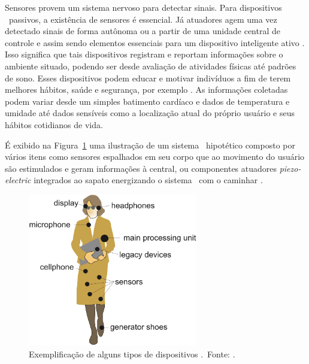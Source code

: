         Sensores provem um sistema nervoso para detectar sinais.
        Para dispositivos \wearables\ passivos, a existência de sensores é essencial.
        Já atuadores agem uma vez detectado sinais de forma autônoma ou a partir de uma unidade central de controle e assim sendo elementos essenciais para um dispositivo inteligente ativo \citep{starner1996human}.
        Isso significa que tais dispositivos registram e reportam informações sobre o ambiente situado, podendo ser desde avaliação de atividades físicas até padrões de sono.
        Esses dispositivos podem educar e motivar indivíduos a fim de terem melhores hábitos, saúde e segurança, por exemplo \citep{patel2015wearable}.
        As informações coletadas podem variar desde um simples batimento cardíaco e dados de temperatura e umidade até dados sensíveis como a localização atual do próprio usuário e seus hábitos cotidianos de vida.
        
        
        É exibido na Figura~\ref{fig:into-wearable} uma ilustração de um sistema \wearable\ hipotético composto por vários itens como 
        sensores espalhados em seu corpo que ao movimento do usuário são estimulados e geram informações à central, ou 
        componentes atuadores \textit{piezo-electric} integrados ao sapato energizando o sistema \wearable\ com o caminhar \citep{VanLaerhoven2002, Kern2002, Kymissis1998}.
        
        \begin{figure}[h] \centering
            \includegraphics[width=0.66\textwidth]{img/into-wearable2.png}
            \caption{Exemplificação de alguns tipos de dispositivos \wearables.\ Fonte: \citet{Plessl2003}.}
            \label{fig:into-wearable}
        \end{figure}
        
